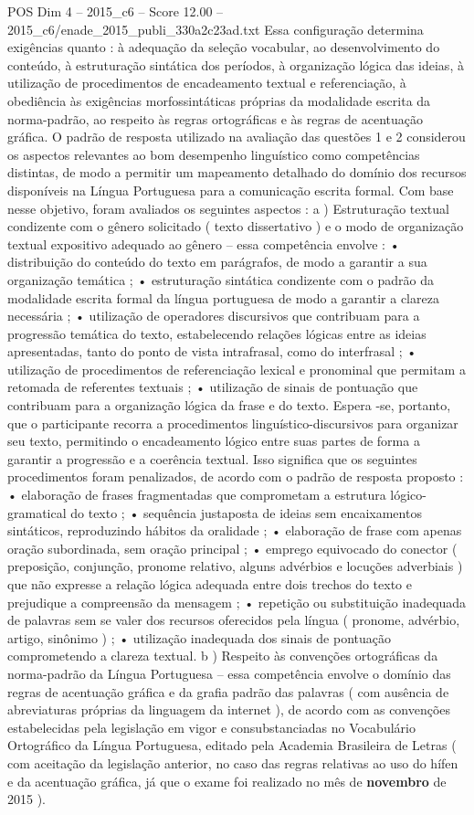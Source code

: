 \begin{textsample}{POS Dim 4 – 2015\_c6 – Score 12.00 – 2015\_c6/enade\_2015\_publi\_330a2c23ad.txt}
Essa configuração determina exigências quanto : à adequação da seleção vocabular, ao desenvolvimento do conteúdo, à estruturação sintática dos períodos, à organização lógica das ideias, à utilização de procedimentos de encadeamento textual e referenciação, à obediência às exigências morfossintáticas próprias da modalidade escrita da norma-padrão, ao respeito às regras ortográficas e às regras de acentuação gráfica.
O padrão de resposta utilizado na avaliação das questões 1 e 2 considerou os aspectos relevantes ao bom desempenho linguístico como competências distintas, de modo a permitir um mapeamento detalhado do domínio dos recursos disponíveis na Língua Portuguesa para a comunicação escrita formal.
Com base nesse objetivo, foram avaliados os seguintes aspectos : a ) Estruturação textual condizente com o gênero solicitado ( texto dissertativo ) e o modo de organização textual expositivo adequado ao gênero – essa competência envolve : • distribuição do conteúdo do texto em parágrafos, de modo a garantir a sua organização temática ; • estruturação sintática condizente com o padrão da modalidade escrita formal da língua portuguesa de modo a garantir a clareza necessária ; • utilização de operadores discursivos que contribuam para a progressão temática do texto, estabelecendo relações lógicas entre as ideias apresentadas, tanto do ponto de vista intrafrasal, como do interfrasal ; • utilização de procedimentos de referenciação lexical e pronominal que permitam a retomada de referentes textuais ; • utilização de sinais de pontuação que contribuam para a organização lógica da frase e do texto.
Espera -se, portanto, que o participante recorra a procedimentos linguístico-discursivos para organizar seu texto, permitindo o encadeamento lógico entre suas partes de forma a garantir a progressão e a coerência textual.
Isso significa que os seguintes procedimentos foram penalizados, de acordo com o padrão de resposta proposto : • elaboração de frases fragmentadas que comprometam a estrutura lógico-gramatical do texto ; • sequência justaposta de ideias sem encaixamentos sintáticos, reproduzindo hábitos da oralidade ; • elaboração de frase com apenas oração subordinada, sem oração principal ; • emprego equivocado do conector ( preposição, conjunção, pronome relativo, alguns advérbios e locuções adverbiais ) que não expresse a relação lógica adequada entre dois trechos do texto e prejudique a compreensão da mensagem ; • repetição ou substituição inadequada de palavras sem se valer dos recursos oferecidos pela língua ( pronome, advérbio, artigo, sinônimo ) ; • utilização inadequada dos sinais de pontuação comprometendo a clareza textual. b ) Respeito às convenções ortográficas da norma-padrão da Língua Portuguesa – essa competência envolve o domínio das regras de acentuação gráfica e da grafia padrão das palavras ( com ausência de abreviaturas próprias da linguagem da internet ), de acordo com as convenções estabelecidas pela legislação em vigor e consubstanciadas no Vocabulário Ortográfico da Língua Portuguesa, editado pela Academia Brasileira de Letras ( com aceitação da legislação anterior, no caso das regras relativas ao uso do hífen e da acentuação gráfica, já que o exame foi realizado no mês de \textbf{novembro} de 2015 ).

\end{textsample}
